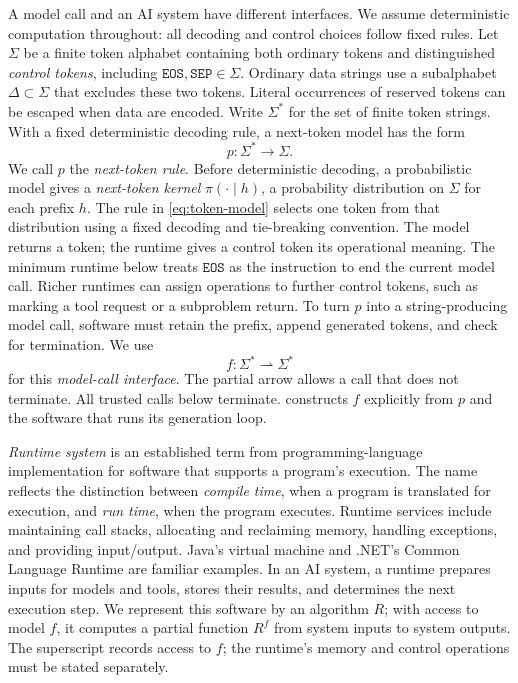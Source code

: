 \documentclass[11pt,twoside]{article}
\newcommand{\eos}{\mathtt{EOS}}
\newcommand{\sep}{\mathtt{SEP}}
\theoremstyle{definition}
\theoremstyle{remark}
\begin{document}
A model call and an AI system have different interfaces. We assume
deterministic computation throughout: all decoding and control choices
follow fixed rules. Let $\Sigma$ be a
finite token alphabet containing both ordinary tokens and distinguished
\emph{control tokens}, including $\eos,\sep\in\Sigma$. Ordinary data
strings use a subalphabet $\Delta\subset\Sigma$ that excludes these two
tokens. Literal occurrences of reserved tokens can be escaped when data
are encoded. Write $\Sigma^*$ for the
set of finite token strings. With a fixed deterministic decoding rule, a
next-token model has the form
\begin{equation}
 p:\Sigma^*\longrightarrow\Sigma.
 \label{eq:token-model}
\end{equation}
We call $p$ the \emph{next-token rule}. Before deterministic decoding, a
probabilistic model gives a \emph{next-token kernel}
$\pi(\cdot\mid h)$, a probability distribution on $\Sigma$ for each prefix
$h$. The rule in \eqref{eq:token-model} selects one token from that
distribution using a fixed decoding and tie-breaking convention.
The model returns a token; the runtime gives a control token its operational
meaning. The minimum runtime below treats $\eos$ as the instruction to end
the current model call. Richer runtimes can assign operations to further
control tokens, such as marking a tool request or a subproblem return.
To turn $p$ into a string-producing model call, software must retain the
prefix, append generated tokens, and check for termination. We use
\begin{equation}
 f:\Sigma^*\rightharpoonup\Sigma^*
 \label{eq:call-model}
\end{equation}
for this \emph{model-call interface}. The partial arrow allows a call that
does not terminate. All trusted calls below terminate.
 constructs $f$ explicitly from $p$ and the
software that runs its generation loop.

\emph{Runtime system} is an established term from programming-language
implementation for software that supports a program's execution. The name
reflects the distinction between \emph{compile time}, when a program is
translated for execution, and \emph{run time}, when the program executes.
Runtime services include maintaining call stacks, allocating and reclaiming
memory, handling exceptions, and providing input/output. Java's virtual
machine and .NET's
Common Language Runtime are familiar examples. In an AI system, a runtime
prepares inputs for models and tools, stores their results, and determines
the next execution step. We represent this software
by an algorithm $R$; with access to model $f$, it computes a partial
function $R^f$ from system inputs to system outputs. The superscript records
access to $f$; the runtime's memory and control operations must be stated
separately.
\end{document}
